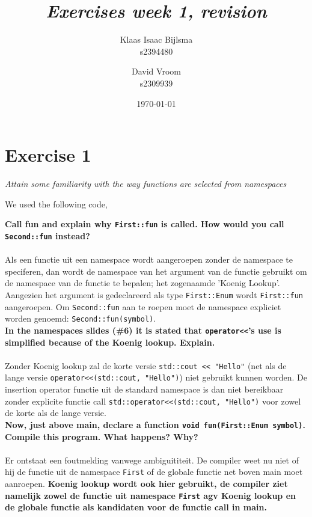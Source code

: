 \documentclass[12pt]{article}
\title{\itshape Exercises week 1, revision}
\author{
	Klaas Isaac Bijlsma \\ s2394480
	\and
	David Vroom \\ s2309939
}
\date{\today}
\newcommand{\desc}[1]{\textit{#1} \vspace{1em}}
\begin{document}
\maketitle
\section*{Exercise 1}
\desc{Attain some familiarity with the way functions are selected from namespaces}

We used the following code,


\textbf{Call fun and explain why \texttt{First::fun} is called. How would you call \texttt{Second::fun} instead?}\\
\\
Als een functie uit een namespace wordt aangeroepen zonder de namespace te speciferen, dan wordt de namespace van het argument van de functie gebruikt om de namespace van de functie te bepalen; het zogenaamde 'Koenig Lookup'. Aangezien het argument is gedeclareerd als type \texttt{First::Enum} wordt \texttt{First::fun} aangeroepen. Om \texttt{Second::fun} aan te roepen moet de namespace expliciet worden genoemd: \texttt{Second::fun(symbol)}.\\

\textbf{In the namespaces slides (\#6) it is stated that \texttt{operator<<}'s use is simplified because of the Koenig lookup. Explain.}\\
\\
Zonder Koenig lookup zal de korte versie \texttt{std::cout << "Hello"} (net als de lange versie \texttt{operator<<(std::cout, "Hello")}) niet gebruikt kunnen worden. De insertion operator functie uit de standard namespace is dan niet bereikbaar zonder explicite functie call \texttt{std::operator<<(std::cout, "Hello")} voor zowel de korte als de lange versie.\\

\textbf{Now, just above main, declare a function \texttt{void fun(First::Enum symbol)}. Compile this program. What happens? Why?}\\
\\
Er ontstaat een foutmelding vanwege ambiguititeit. De compiler weet nu niet of hij de functie uit de namespace \texttt{First} of de globale functie net boven main moet aanroepen. \textbf{Koenig lookup wordt ook hier gebruikt, de compiler ziet namelijk zowel de functie uit namespace \texttt{First} agv Koenig lookup en de globale functie als kandidaten voor de functie call in main.}


\clearpage
\end{document}
